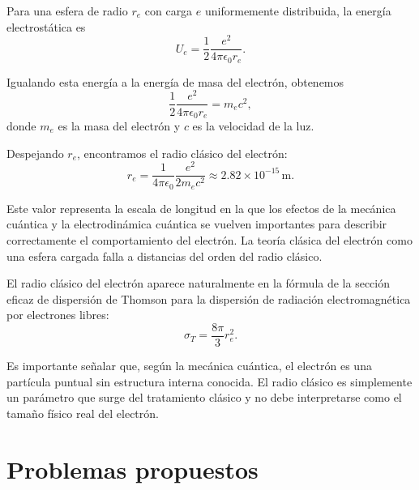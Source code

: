 \documentclass[12pt,a4paper]{book}
\begin{document}
Para una esfera de radio $r_e$ con carga $e$ uniformemente distribuida, la energía electrostática es
\begin{equation}
U_e = \frac{1}{2} \frac{e^2}{4\pi\epsilon_0 r_e}.
\end{equation}

Igualando esta energía a la energía de masa del electrón, obtenemos
\begin{equation}
\frac{1}{2} \frac{e^2}{4\pi\epsilon_0 r_e} = m_e c^2,
\end{equation}
donde $m_e$ es la masa del electrón y $c$ es la velocidad de la luz.

Despejando $r_e$, encontramos el radio clásico del electrón:
\begin{equation}
r_e = \frac{1}{4\pi\epsilon_0} \frac{e^2}{2m_e c^2} \approx 2.82 \times 10^{-15} \, \textrm{m}.
\end{equation}

Este valor representa la escala de longitud en la que los efectos de la mecánica cuántica y la electrodinámica cuántica se vuelven importantes para describir correctamente el comportamiento del electrón. La teoría clásica del electrón como una esfera cargada falla a distancias del orden del radio clásico.

El radio clásico del electrón aparece naturalmente en la fórmula de la sección eficaz de dispersión de Thomson para la dispersión de radiación electromagnética por electrones libres:
\begin{equation}
\sigma_T = \frac{8\pi}{3} r_e^2.
\end{equation}

Es importante señalar que, según la mecánica cuántica, el electrón es una partícula puntual sin estructura interna conocida. El radio clásico es simplemente un parámetro que surge del tratamiento clásico y no debe interpretarse como el tamaño físico real del electrón.

\section{Problemas propuestos}
\end{document}
